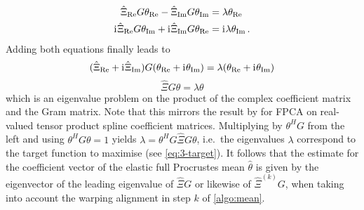 \begin{align}
  \hat\Xi_{\mathrm{Re}} G \theta_{\mathrm{Re}} - \hat\Xi_{\mathrm{Im}} G \theta_{\mathrm{Im}} & = \lambda \theta_{\mathrm{Re}}\\
   \mathrm{i}\mkern1mu \hat\Xi_{\mathrm{Re}} G \theta_{\mathrm{Im}} + \mathrm{i}\mkern1mu \hat\Xi_{\mathrm{Im}} G \theta_{\mathrm{Re}} & = \mathrm{i}\mkern1mu \lambda \theta_{\mathrm{Im}} \,.
\end{align}
Adding both equations finally leads to  
\begin{equation}
  ( \hat\Xi_{\mathrm{Re}} + \mathrm{i}\mkern1mu \hat\Xi_{\mathrm{Im}}) G (\theta_{\mathrm{Re}} +  \mathrm{i}\mkern1mu \theta_{\mathrm{Im}}) = \lambda ( \theta_{\mathrm{Re}} + \mathrm{i}\mkern1mu \theta_{\mathrm{Im}})
\end{equation}
\begin{equation}
  \hat\Xi G \theta = \lambda \theta
\end{equation}
which is an eigenvalue problem on the product of the complex coefficient matrix and the Gram matrix.
Note that this mirrors the result by \cite{ReissXu2020} for FPCA on real-valued tensor product spline coefficient matrices.
Multiplying by $\theta^H G$ from the left and using $\theta^H G \theta = 1$ yields $\lambda = \theta^H G \hat\Xi G \theta$, i.e.\ the eigenvalues $\lambda$ correspond to the target function to maximise (see \cref{eq:3-target}).
It follows that the estimate for the coefficient vector of the elastic full Procrustes mean $\hat\theta$ is given by the eigenvector of the leading eigenvalue of $\hat\Xi G$ or likewise of $\hat\Xi^{(k)} G$, when taking into account the warping alignment in step $k$ of \cref{algo:mean}.

